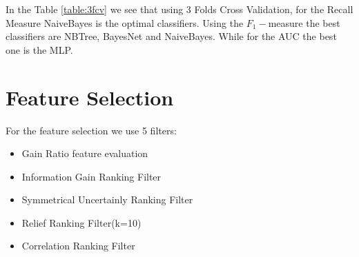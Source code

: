 \documentclass[fleqn,10pt]{SelfArx} %
\begin{document}
\begin{table}[h]
	\caption{Evaluation measures using 3-Folds Cross Validation}
	\label{table:3fcv}
\end{table}

\noindent
In the Table \ref{table:3fcv} we see that using 3 Folds Cross Validation, for the Recall Measure NaiveBayes is the optimal classifiers. Using the $F_1-$measure the best classifiers are NBTree, BayesNet and NaiveBayes. While for the AUC the best one is the MLP.


\section{Feature Selection}
For the feature selection we use 5 filters:
\begin{itemize}[noitemsep]
	\item Gain Ratio feature evaluation
	\item Information Gain Ranking Filter
	\item Symmetrical Uncertainly Ranking Filter
	\item Relief Ranking Filter(k=10)
	\item Correlation Ranking Filter
\end{itemize}
\end{document}
